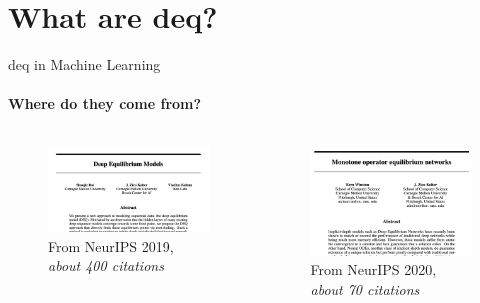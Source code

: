 \documentclass[8pt, t,
aspectratio=169,%
]{beamer}
\begin{document}
\section{What are \acrlong{deq}?}
\begin{frame}{\Acrlong{deq} in Machine Learning}
    \framesubtitle{Where do they come from?}
    \begin{columns}[T]
            \begin{figure}
                \includegraphics[width=\textwidth]{deq.png}
                \caption{From NeurIPS 2019, \emph{about 400 citations} \cite{bai2019deep}}
            \end{figure}
            \pause
            \begin{figure}
                \includegraphics[width=\textwidth]{mon_deq.png}
                \caption{From NeurIPS 2020, \emph{about 70 citations} \cite{winston2020monotone}}
            \end{figure}
            \pause

\end{columns}
\end{frame}
\end{document}

